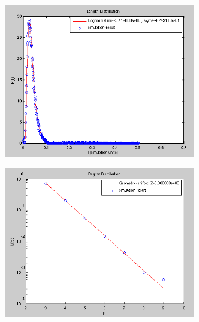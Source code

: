 \begin{figure}[h!]
  \centering
  \begin{subfigure}{0.32\textwidth}
    \centering
    \includegraphics[width=0.92\textwidth]{Figures/chapter-reconstruct/lengthN10000.png}%
    \label{collagen_length}
  \end{subfigure}%
  \begin{subfigure}{0.32\textwidth}
    \centering
    \includegraphics[width=0.92\textwidth]{Figures/chapter-reconstruct/degreeN10000.png}%
    \label{collagen_degree}
  \end{subfigure}%
  \begin{subfigure}{0.32\textwidth}
    \centering

\end{subfigure}
\end{figure}
